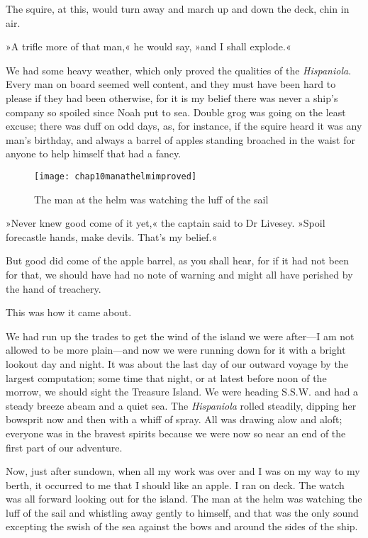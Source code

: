The squire, at this, would turn away and march up and down the deck, chin in air.

»A trifle more of that man,« he would say, »and I shall explode.«

We had some heavy weather, which only proved the qualities of the \textit{Hispaniola}. Every man on board seemed well content, and they must have been hard to please if they had been otherwise, for it is my belief there was never a ship's company so spoiled since Noah put to sea. Double grog was going on the least excuse; there was duff on odd days, as, for instance, if the squire heard it was any man's birthday, and always a barrel of apples standing broached in the waist for anyone to help himself that had a fancy.

 \begin{figure}[ph]
\centering
\texttt{[image: chap10manathelmimproved]}
\caption{The man at the helm was watching the luff of the sail}
\end{figure}

»Never knew good come of it yet,« the captain said to Dr Livesey. »Spoil forecastle hands, make devils. That's my belief.«

But good did come of the apple barrel, as you shall hear, for if it had not been for that, we should have had no note of warning and might all have perished by the hand of treachery.

This was how it came about.

We had run up the trades to get the wind of the island we were after—I am not allowed to be more plain—and now we were running down for it with a bright lookout day and night. It was about the last day of our outward voyage by the largest computation; some time that night, or at latest before noon of the morrow, we should sight the Treasure Island. We were heading S.S.W. and had a steady breeze abeam and a quiet sea. The \textit{Hispaniola} rolled steadily, dipping her bowsprit now and then with a whiff of spray. All was drawing alow and aloft; everyone was in the bravest spirits because we were now so near an end of the first part of our adventure.

Now, just after sundown, when all my work was over and I was on my way to my berth, it occurred to me that I should like an apple. I ran on deck. The watch was all forward looking out for the island. The man at the helm was watching the luff of the sail and whistling away gently to himself, and that was the only sound excepting the swish of the sea against the bows and around the sides of the ship.




